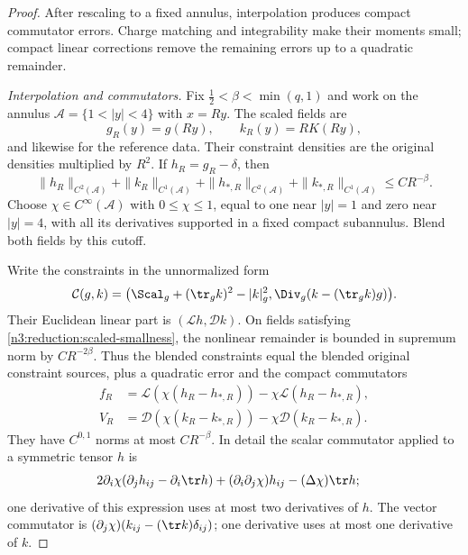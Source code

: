 \begin{proof}
After rescaling to a fixed annulus, interpolation produces compact
commutator errors. Charge matching and integrability make their moments
small; compact linear corrections remove the remaining errors up to a
quadratic remainder.

\emph{Interpolation and commutators.} Fix $\tfrac12<\beta<\min(q,1)$
and work on the annulus
$\mathcal A=\{1<|y|<4\}$ with $x=Ry$.  The scaled fields are
\[
 g_R(y)=g(Ry),\qquad k_R(y)=RK(Ry),
\]
and likewise for the reference data.  Their constraint densities are the
original densities multiplied by $R^2$.  If $h_R=g_R-\delta$, then
\begin{equation}
 \label{n3:reduction:scaled-smallness}
 \|h_R\|_{C^2(\mathcal A)}+\|k_R\|_{C^1(\mathcal A)}
 +\|h_{*,R}\|_{C^2(\mathcal A)}+\|k_{*,R}\|_{C^1(\mathcal A)}
 \le CR^{-\beta}.
\end{equation}
Choose $\chi\in C^\infty(\mathcal A)$ with $0\le\chi\le1$, equal to one near $|y|=1$ and zero
near $|y|=4$, with all its derivatives supported in a fixed compact
subannulus.  Blend both fields by this cutoff.

Write the constraints in the unnormalized form
\[
 \mathcal C(g,k)
 =\bigl(\Scal_g+(\tr_gk)^2-|k|_g^2,
             \Div_g(k-(\tr_gk)g)\bigr).
\]
Their Euclidean linear part is $(\mathcal Lh,\mathcal Dk)$.
On fields satisfying \eqref{n3:reduction:scaled-smallness}, the
nonlinear remainder is bounded in supremum norm by $CR^{-2\beta}$.
Thus the blended constraints equal the blended original constraint
sources, plus a quadratic error and the compact commutators
\begin{align*}
 f_R&=\mathcal L(\chi(h_R-h_{*,R}))
                      -\chi\mathcal L(h_R-h_{*,R}),\\
 V_R&=\mathcal D(\chi(k_R-k_{*,R}))
                      -\chi\mathcal D(k_R-k_{*,R}).
\end{align*}
They have $C^{0,1}$ norms at most $CR^{-\beta}$.  In detail the scalar
commutator applied to a symmetric tensor $h$ is
\begin{align*}
 &2\partial_i\chi(\partial_jh_{ij}-\partial_i\tr h)
       +(\partial_i\partial_j\chi)h_{ij}-(\Delta\chi)\tr h;
\end{align*}
one derivative of this expression uses at most two derivatives of $h$.
The vector commutator is $(\partial_j\chi)(k_{ij}-(\tr k)\delta_{ij})$;
one derivative uses at most one derivative of $k$.


\end{proof}
